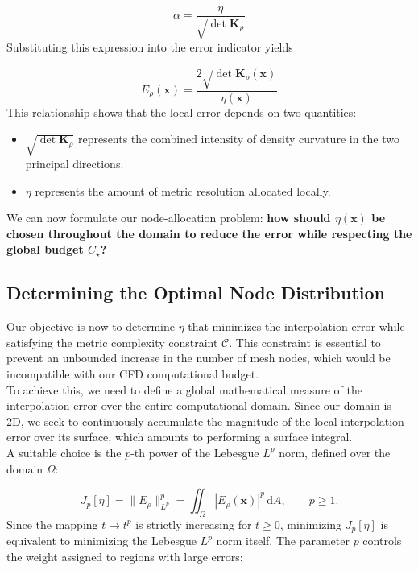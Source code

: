 \documentclass[11pt,a4paper]{article}
\begin{document}
\begin{equation}
\alpha=\frac{\eta}{\sqrt{\det\mathbf K_\rho}}
\end{equation}
\noindent
Substituting this expression into the error indicator yields

\begin{equation}
\boxed{
E_\rho(\mathbf x)
=\frac{2\sqrt{\det\mathbf K_\rho(\mathbf x)}}{\eta(\mathbf x)}
}
\end{equation}
\noindent
This relationship shows that the local error depends on two quantities:

\begin{itemize}
\item $\sqrt{\det\mathbf K_\rho}$ represents the combined intensity of density curvature in the two principal directions.
\item $\eta$ represents the amount of metric resolution allocated locally.
\end{itemize}

\noindent
We can now formulate our node-allocation problem: \textbf{how should $\eta(\mathbf x)$ be chosen throughout the domain to reduce the error while respecting the global budget $C_\star$?}


\subsection{Determining the Optimal Node Distribution}

Our objective is now to determine $\eta$ that minimizes the interpolation error while satisfying the metric complexity constraint $\mathcal C$. This constraint is essential to prevent an unbounded increase in the number of mesh nodes, which would be incompatible with our CFD computational budget.\\

\noindent
To achieve this, we need to define a global mathematical measure of the interpolation error over the entire computational domain. Since our domain is 2D, we seek to continuously accumulate the magnitude of the local interpolation error over its surface, which amounts to performing a surface integral.\\

\noindent
A suitable choice is the $p$-th power of the Lebesgue $L^p$ norm, defined over the domain $\Omega$:

\begin{equation}
    \boxed{
    J_p[\eta]
    = \|E_\rho\|_{L^p}^p
    = \iint_\Omega |E_\rho(\mathbf{x})|^p \, \mathrm{d}A,
    \qquad p \geq 1.
    }
\end{equation}
\noindent
Since the mapping $t \mapsto t^p$ is strictly increasing for $t \geq 0$, minimizing $J_p[\eta]$ is equivalent to minimizing the Lebesgue $L^p$ norm itself. The parameter $p$ controls the weight assigned to regions with large errors:
\end{document}
